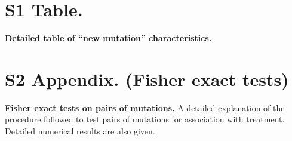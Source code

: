 \documentclass[
  11,
]{scrbook}
\begin{document}
\hypertarget{S1-Table}{%
\section{S1 Table.}\label{S1-Table}}

\textbf{Detailed table of ``new mutation'' characteristics.}

\hypertarget{S2-Appendix}{%
\section{S2 Appendix. (Fisher exact tests)}\label{S2-Appendix}}

\textbf{Fisher exact tests on pairs of mutations.} A detailed explanation of
the procedure followed to test pairs of mutations for association with
treatment. Detailed numerical results are also given.
\end{document}
